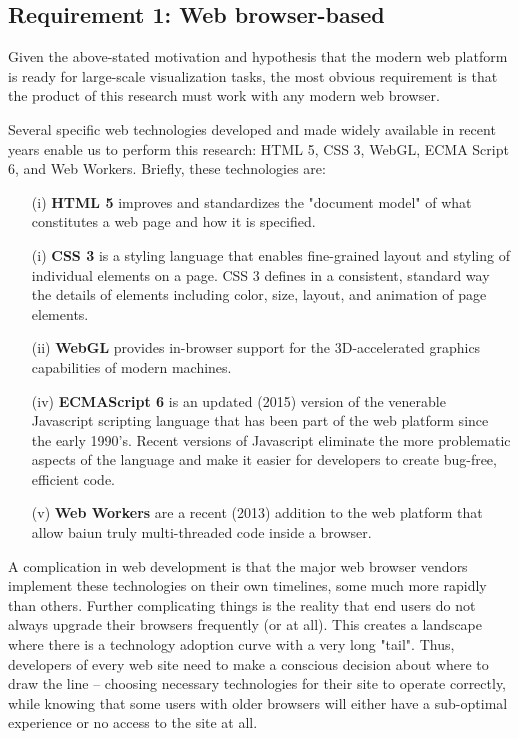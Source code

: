 \documentclass[Afour,sagev,times]{sagej}
\begin{document}
\subsection{Requirement 1: Web browser-based}

Given the above-stated motivation and hypothesis that the modern web
platform is ready for large-scale visualization tasks, the most obvious requirement is that the product of this research must work with any modern web browser.

Several specific web technologies developed and made widely available in recent years enable us to perform this research: HTML 5, CSS 3, WebGL, ECMA Script 6, and Web Workers. Briefly, these technologies are:

\begin{enumerate}

\item[(i)] \textbf{HTML 5} improves and standardizes the "document model" of what constitutes a web page and how it is specified.
\item[(i)] \textbf{CSS 3} is a styling language that enables fine-grained layout and styling of individual elements on a page. CSS 3 defines in a consistent, standard way the details of elements including color, size, layout, and animation of page elements.
\item[(ii)] \textbf{WebGL} provides in-browser support for the 3D-accelerated graphics capabilities of modern machines.
\item[(iv)] \textbf{ECMAScript 6} is an updated (2015) version of the venerable Javascript scripting language that has been part of the web platform since the early 1990's. Recent versions of Javascript eliminate the more problematic aspects of the language and make it easier for developers to create bug-free, efficient code.
\item[(v)] \textbf{Web Workers} are a recent (2013) addition to the web platform that allow baiun truly multi-threaded code inside a browser.

\end{enumerate}

A complication in web development is that the major web browser vendors implement these technologies on their own timelines, some much more rapidly than others. Further complicating things is the reality that end users do not always upgrade their browsers frequently (or at all). This creates a landscape where there is a technology adoption curve with a very long "tail". Thus, developers of every web site need to make a conscious decision about where to
draw the line -- choosing necessary technologies for their site to operate correctly, while knowing that some users with older browsers will either have a sub-optimal experience or no access to the site at all.
\end{document}
